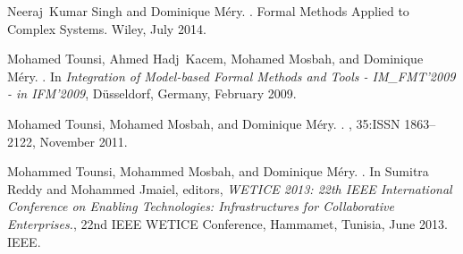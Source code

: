 \documentclass[ 12pt]{article}
\begin{document}
\begin{thebibliography}{100}
Neeraj~Kumar Singh and Dominique M{\'e}ry.
.
\newblock Formal Methods Applied to Complex Systems. {Wiley}, July 2014.

Mohamed Tounsi, Ahmed Hadj~Kacem, Mohamed Mosbah, and Dominique M{\'e}ry.
.
\newblock In {\em {Integration of Model-based Formal Methods and Tools -
  IM\_FMT'2009 - in IFM'2009}}, D{\"u}sseldorf, Germany, February 2009.

Mohamed Tounsi, Mohamed Mosbah, and Dominique M{\'e}ry.
.
, 35:ISSN 1863--2122,
  November 2011.

Mohammed Tounsi, Mohammed Mosbah, and Dominique M{\'e}ry.
.
\newblock In Sumitra Reddy and Mohammed Jmaiel, editors, {\em {WETICE 2013:
  22th IEEE International Conference on Enabling Technologies: Infrastructures
  for Collaborative Enterprises.}}, 22nd IEEE WETICE Conference, Hammamet,
  Tunisia, June 2013. {IEEE}.

\end{thebibliography}
\end{document}
